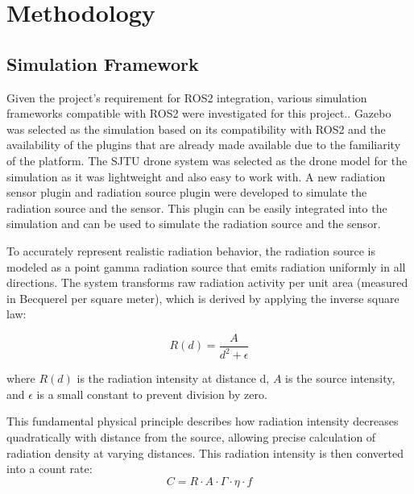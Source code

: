 \documentclass[../report.tex]{subfiles}
\begin{document}
    \section{Methodology}
    \label{sec:methodology}


    \subsection{Simulation Framework}
    Given the project's requirement for ROS2 integration, various simulation frameworks compatible with ROS2 were investigated for this project.. Gazebo was selected as the simulation based on its compatibility with ROS2 
    and the availability of the plugins that are already made available due to the familiarity of the platform. The SJTU drone system was selected as the drone model for the simulation as it was 
    lightweight and also easy to work with. A new radiation sensor plugin and radiation source plugin were developed to simulate the radiation source and the sensor. This plugin can be easily 
    integrated into the simulation and can be used to simulate the radiation source and the sensor. 
        
    To accurately represent realistic radiation behavior, the radiation source is modeled as a point gamma radiation source that emits radiation uniformly in all directions. 
    The system transforms raw radiation activity per unit area (measured in Becquerel per square meter), which is derived by applying the inverse square law:
    
    \begin{equation}
        R(d) = \frac{A}{d^2 + \epsilon}
    \end{equation}

    where $R(d)$ is the radiation intensity at distance d, $A$ is the source intensity, and $\epsilon$ is a small constant to prevent division by zero.

    This fundamental physical principle describes how radiation intensity decreases quadratically with distance from the source, allowing precise calculation of 
    radiation density at varying distances. This radiation intensity is then converted into a count rate:
    \begin{equation}
        C = R \cdot A \cdot \Gamma \cdot \eta \cdot f 
    \end{equation}
\end{document}
